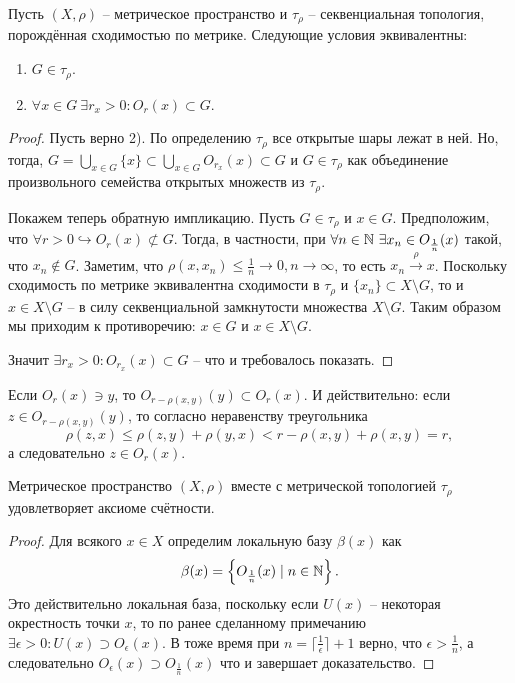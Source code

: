 \begin{proposition}
    Пусть $(X, \rho)$ -- метрическое пространство и $\tau_\rho$ -- секвенциальная топология, порождённая сходимостью по метрике.
    Следующие условия эквивалентны:
    \begin{enumerate}
        \item $G \in \tau_{\rho}$.
        \item $\forall x \in G \ \exists r_x > 0\colon O_r(x) \subset G$.
    \end{enumerate}
\end{proposition}
\begin{proof}
    Пусть верно 2).
    По определению $\tau_{\rho}$ все открытые шары лежат в ней.
    Но, тогда, $G = \bigcup_{x \in G} \{x\} \subset \bigcup_{x \in G} O_{r_x}(x) \subset G$ и $G \in \tau_{\rho}$ как объединение произвольного семейства открытых множеств из $\tau_{\rho}$.

    Покажем теперь обратную импликацию.
    Пусть $G \in \tau_{\rho}$ и $x \in G$.
    Предположим, что $\forall r > 0 \hookrightarrow O_r(x) \not\subset G$.
    Тогда, в частности, при $\forall n \in \N \ \exists x_n \in O_{\frac{1}{n}}(x)$ такой, что $x_n \notin G$.
    Заметим, что $\rho(x, x_n) \leq \frac{1}{n} \rightarrow 0, n \rightarrow \infty$, то есть $x_n \xrightarrow{\rho} x$.
    Поскольку сходимость по метрике эквивалентна сходимости в $\tau_{\rho}$ и $\{x_n\} \subset X \setminus G$, то и $x \in X \setminus G$ -- в силу секвенциальной замкнутости множества $X \setminus G$.
    Таким образом мы приходим к противоречию: $x \in G$ и $x \in X \setminus G$.

    Значит $\exists r_x > 0\colon O_{r_x}(x) \subset G$ -- что и требовалось показать.
\end{proof}
\begin{note}
    Если $O_r(x) \ni y$, то $O_{r - \rho(x, y)}(y) \subset O_r(x)$.
    И действительно: если $z \in O_{r - \rho(x, y)}(y)$, то согласно неравенству треугольника
    \[
        \rho(z, x) \leq \rho(z, y) + \rho(y, x) < r - \rho(x, y) + \rho(x, y) = r,
    \]
    а следовательно $z \in O_r(x)$.
\end{note}
\begin{lemma}
    Метрическое пространство $(X, \rho)$ вместе с метрической топологией $\tau_\rho$ удовлетворяет аксиоме счётности.
\end{lemma}
\begin{proof}
    Для всякого $x \in X$ определим локальную базу $\beta(x)$ как
    \[
        \beta(x) = \left\{O_{\frac{1}{n}}(x) \mid n \in \mathbb{N} \right\}.
    \]
    Это действительно локальная база, поскольку если $U(x)$ -- некоторая окрестность точки $x$, то по ранее сделанному примечанию $\exists \epsilon > 0 \colon U(x) \supset O_\epsilon(x)$.
    В тоже время при $n = \lceil \frac{1}{\epsilon} \rceil + 1$ верно, что $\epsilon > \frac{1}{n}$, а следовательно $O_{\epsilon}(x) \supset O_{\frac{1}{n}}(x)$ что и завершает доказательство.
\end{proof}
